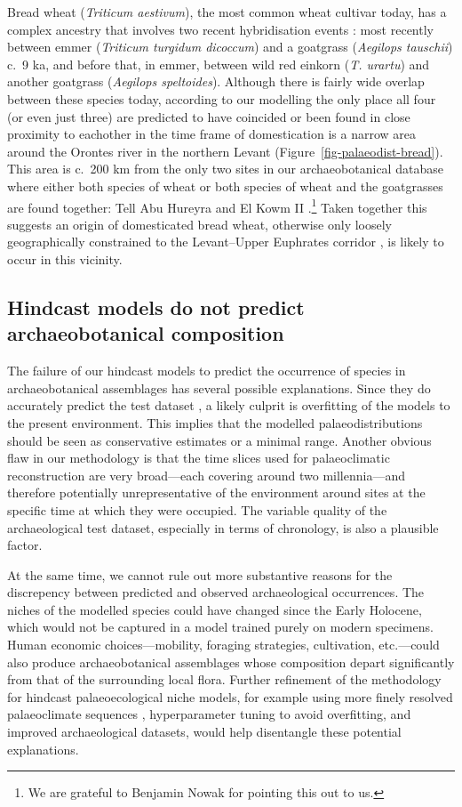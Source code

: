 \documentclass[
  authoryear,
  preprint]{elsarticle}
\begin{document}
Bread wheat (\emph{Triticum aestivum}), the most common wheat cultivar
today, has a complex ancestry that involves two recent hybridisation
events \citep{LevyFeldman2022}: most recently between emmer
(\emph{Triticum turgidum dicoccum}) and a goatgrass (\emph{Aegilops
tauschii}) c.~9 ka, and before that, in emmer, between wild red einkorn
(\emph{T. urartu}) and another goatgrass (\emph{Aegilops speltoides}).
Although there is fairly wide overlap between these species today,
according to our modelling the only place all four (or even just three)
are predicted to have coincided or been found in close proximity to
eachother in the time frame of domestication is a narrow area around the
Orontes river in the northern Levant
(Figure~\ref{fig-palaeodist-bread}). This area is c.~200 km from the
only two sites in our archaeobotanical database where either both
species of wheat or both species of wheat and the goatgrasses are found
together: Tell Abu Hureyra and El Kowm II
\citep{ArranzOtaeguiRoe2023}.\footnote{We are grateful to Benjamin Nowak
  for pointing this out to us.} Taken together this suggests an origin
of domesticated bread wheat, otherwise only loosely geographically
constrained to the Levant--Upper Euphrates corridor
\citep{LevyFeldman2022}, is likely to occur in this vicinity.

\subsection{Hindcast models do not predict archaeobotanical
composition}\label{hindcast-models-do-not-predict-archaeobotanical-composition}

The failure of our hindcast models to predict the occurrence of species
in archaeobotanical assemblages has several possible explanations. Since
they do accurately predict the test dataset , a likely culprit is
overfitting of the models to the present environment. This implies that
the modelled palaeodistributions should be seen as conservative
estimates or a minimal range. Another obvious flaw in our methodology is
that the time slices used for palaeoclimatic reconstruction are very
broad---each covering around two millennia---and therefore potentially
unrepresentative of the environment around sites at the specific time at
which they were occupied. The variable quality of the archaeological
test dataset, especially in terms of chronology, is also a plausible
factor.

At the same time, we cannot rule out more substantive reasons for the
discrepency between predicted and observed archaeological occurrences.
The niches of the modelled species could have changed since the Early
Holocene, which would not be captured in a model trained purely on
modern specimens. Human economic choices---mobility, foraging
strategies, cultivation, etc.---could also produce archaeobotanical
assemblages whose composition depart significantly from that of the
surrounding local flora. Further refinement of the methodology for
hindcast palaeoecological niche models, for example using more finely
resolved palaeoclimate sequences \citep[e.g.][]{KargerEtAl2023},
hyperparameter tuning to avoid overfitting, and improved archaeological
datasets, would help disentangle these potential explanations.
\end{document}
